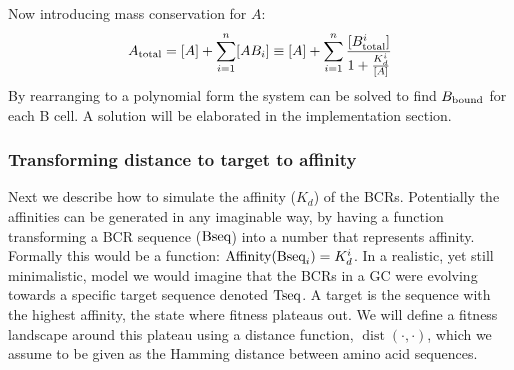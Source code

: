 \noindent
Now introducing mass conservation for $A$:
\begin{equation}
A_{\text{total}} = [A] + \sum_{i=1}^{n} [AB_i] \equiv [A] + \sum_{i=1}^{n} \frac{[B^i_{\text{total}}]}{1 + \frac{K^i_d}{[A]}}
  \label{eq:A_objective}
\end{equation}
By rearranging to a polynomial form the system can be solved to find $B_{\text{bound}}$ for each B cell.
A solution will be elaborated in the implementation section.




\subsubsection{Transforming distance to target to affinity}
Next we describe how to simulate the affinity ($K_d$) of the BCRs.
Potentially the affinities can be generated in any imaginable way, by having a function transforming a BCR sequence ($\text{Bseq}$) into a number that represents affinity.
Formally this would be a function: $\text{Affinity}(\text{Bseq}_i) = K^i_d$.
In a realistic, yet still minimalistic, model we would imagine that the BCRs in a GC were evolving towards a specific target sequence denoted $\text{Tseq}$.
A target is the sequence with the highest affinity, the state where fitness plateaus out.
We will define a fitness landscape around this plateau using a distance function, $\operatorname{dist}(\cdot,\cdot)$, which we assume to be given as the Hamming distance between amino acid sequences.

